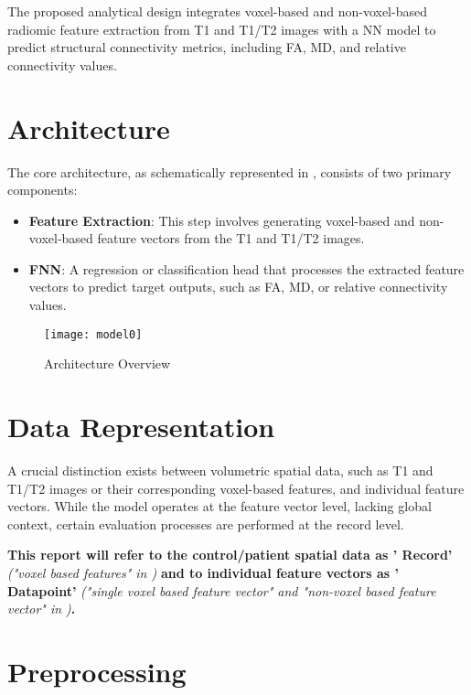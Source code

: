 The proposed analytical design integrates voxel-based and non-voxel-based radiomic feature extraction from T1 and T1/T2 images with a \ac{NN} model to predict structural connectivity metrics, including \ac{FA}, \ac{MD}, and relative connectivity values.

\section{Architecture}

The core architecture, as schematically represented in , consists of two primary components:
\begin{itemize}
\item \textbf{Feature Extraction}: This step involves generating voxel-based and non-voxel-based feature vectors from the T1 and T1/T2 images.
\item \textbf{\ac{FNN}}: A regression or classification head that processes the extracted feature vectors to predict target outputs, such as \ac{FA}, \ac{MD}, or relative connectivity values.
\end{itemize}

\begin{figure}[H]
\centering
\texttt{[image: model0]}
\caption{Architecture Overview}
\label{fig:model0}
\end{figure}

\section{Data Representation}

A crucial distinction exists between volumetric spatial data, such as T1 and T1/T2 images or their corresponding voxel-based features, and individual feature vectors. While the model operates at the feature vector level, lacking global context, certain evaluation processes are performed at the record level.\par
\textbf{This report will refer to the control/patient spatial data as '{\color{red} Record}'} \emph{("voxel based features" in )} \textbf{and to individual feature vectors as '{\color{red} Datapoint}'} \emph{("single voxel based feature vector" and "non-voxel based feature vector" in )}\textbf{.}

\section{Preprocessing}
\label{sec:preproc}

